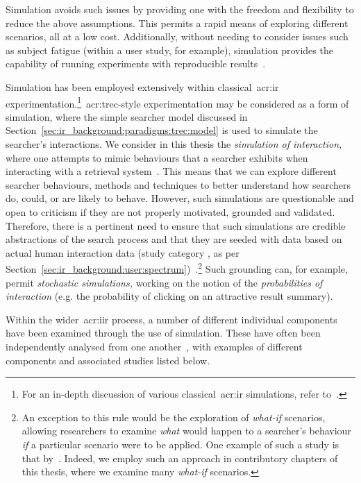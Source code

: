 Simulation avoids such issues by providing one with the freedom and flexibility to reduce the above assumptions. This permits a rapid means of exploring different scenarios, all at a low cost. Additionally, without needing to consider issues such as subject fatigue (within a user study, for example), simulation provides the capability of running experiments with reproducible results~\citep{azzopardi2010workshop}. 

Simulation has been employed extensively within classical~\gls{acr:ir} experimentation.\footnote{For an in-depth discussion of various classical~\gls{acr:ir} simulations, refer to~\cite{heine1981simulation}.}~\gls{acr:trec}-style experimentation may be considered as a form of simulation, where the simple searcher model discussed in Section~\ref{sec:ir_background:paradigms:trec:model} is used to simulate the searcher's interactions. We consider in this thesis the \emph{simulation of interaction,} where one attempts to mimic behaviours that a searcher exhibits when interacting with a retrieval system~\citep{azzopardi2010workshop}. This means that we can explore different searcher behaviours, methods and techniques to better understand how searchers do, could, or are likely to behave. However, such simulations are questionable and open to criticism if they are not properly motivated, grounded and validated. Therefore, there is a pertinent need to ensure that such simulations are credible abstractions of the search process and that they are seeded with data based on actual human interaction data (study category , as per Section~\ref{sec:ir_background:user:spectrum})~\citep{azzopardi2010workshop}.\footnote{An exception to this rule would be the exploration of \emph{what-if} scenarios, allowing researchers to examine \emph{what} would happen to a searcher's behaviour \emph{if} a particular scenario were to be applied. One example of such a study is that by~\cite{azzopardi2011economics}. Indeed, we employ such an approach in contributory chapters of this thesis, where we examine many \emph{what-if} scenarios.} Such grounding can, for example, permit \emph{stochastic simulations,} working on the notion of the \emph{probabilities of interaction} (e.g. the probability of clicking on an attractive result summary).

Within the wider~\gls{acr:iir} process, a number of different individual components have been examined through the use of simulation. These have often been independently analysed from one another~\citep{azzopardi2010workshop}, with examples of different components and associated studies listed below.

